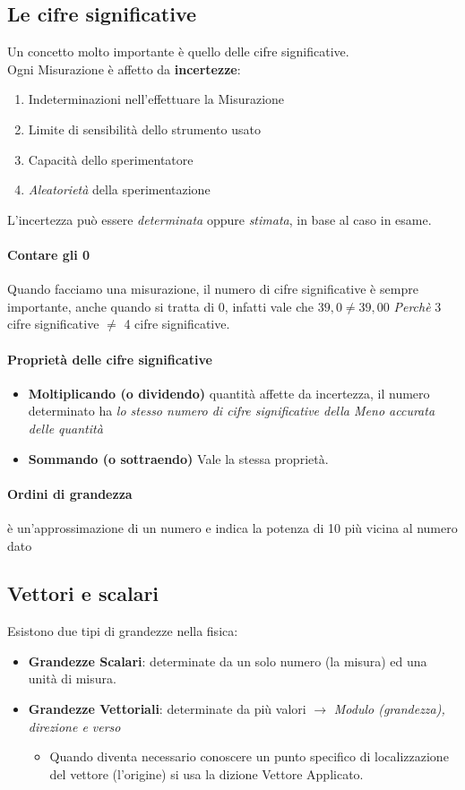 \documentclass[12pt, a4paper, openany]{book}
\begin{document}
\subsection{Le cifre significative}
Un concetto molto importante è quello delle cifre significative.
\\Ogni Misurazione è affetto da \textbf{incertezze}:
\begin{enumerate}
    \item Indeterminazioni nell'effettuare la Misurazione
    \item Limite di sensibilità dello strumento usato
    \item Capacità dello sperimentatore
    \item \emph{Aleatorietà} della sperimentazione
\end{enumerate}
L'incertezza può essere \emph{determinata} oppure \emph{stimata}, in base al caso in esame.
\paragraph{Contare gli 0} Quando facciamo una misurazione, il numero di cifre significative è sempre importante, anche quando si tratta di 0,
infatti vale che $39,0 \neq 39,00$ \emph{Perchè} 3 cifre significative $\neq$ 4 cifre significative.
\paragraph{Proprietà delle cifre significative}
\begin{itemize}
    \item \textbf{Moltiplicando (o dividendo)} quantità affette da incertezza, il numero determinato ha \emph{lo stesso numero di cifre significative della Meno accurata delle quantità}
    \item \textbf{Sommando (o sottraendo)} Vale la stessa proprietà.
\end{itemize}



\paragraph{Ordini di grandezza} 
è un'approssimazione di un numero e indica la potenza di 10 più vicina al numero dato

\subsection{Vettori e scalari} Esistono due tipi di grandezze nella fisica:
\begin{itemize}
    \item \textbf{Grandezze Scalari}: determinate da un solo numero (la misura) ed una unità di misura.
    \item \textbf{Grandezze Vettoriali}: determinate da più valori $\to$ \emph{Modulo (grandezza), direzione e verso}
    \begin{itemize}
        \item Quando diventa necessario conoscere un punto specifico di localizzazione del vettore (l'origine) si usa la dizione Vettore Applicato.
    \end{itemize}
\end{itemize}
\end{document}
